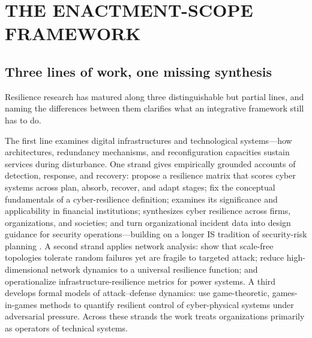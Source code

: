 \section{\MakeUppercase {The Enactment-Scope Framework}}
\label{sec:Enactment-Scope}
\renewcommand{\baselinestretch}{2.0}\normalsize

\subsection{Three lines of work, one missing synthesis}

Resilience research has matured along three distinguishable but partial lines, and naming the differences between them clarifies what an integrative framework still has to do. 

The first line examines digital infrastructures and technological systems---how architectures, redundancy mechanisms, and reconfiguration capacities sustain services during disturbance. One strand gives empirically grounded accounts of detection, response, and recovery: \textcite{linkov2013resilience} propose a resilience matrix that scores cyber systems across plan, absorb, recover, and adapt stages; \textcite{bjorck2015cyber} fix the conceptual fundamentals of a cyber-resilience definition; \textcite{dupont2019cyberresilience} examines its significance and applicability in financial institutions; \textcite{hausken2020cyber} synthesizes cyber resilience across firms, organizations, and societies; and \textcite{kuypers2018designing} turn organizational incident data into design guidance for security operations---building on a longer IS tradition of security-risk planning \autocite{straub1998coping}. A second strand applies network analysis: \textcite{albert2000error} show that scale-free topologies tolerate random failures yet are fragile to targeted attack; \textcite{gao2016universal} reduce high-dimensional network dynamics to a universal resilience function; and \textcite{panteli2017metrics} operationalize infrastructure-resilience metrics for power systems. A third develops formal models of attack--defense dynamics: \textcite{zhu2015game} use game-theoretic, games-in-games methods to quantify resilient control of cyber-physical systems under adversarial pressure. Across these strands the work treats organizations primarily as operators of technical systems. 

